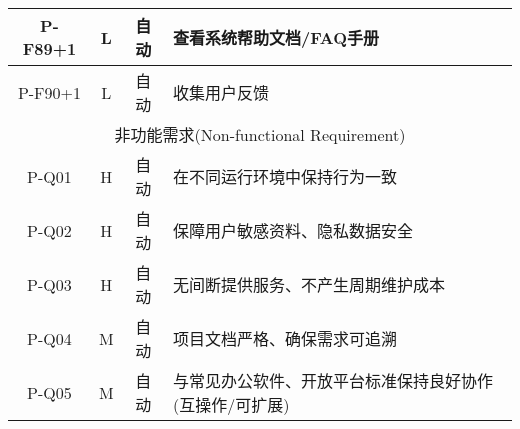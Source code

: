 \begin{longtable}{|c|c|c|X|}
  P-F89+1 & L & 自动 & 查看系统帮助文档/FAQ手册 \\ \hline
  P-F90+1 & L & 自动 & 收集用户反馈 \\ \hline
  \multicolumn{4}{|c|}{非功能需求(Non-functional Requirement)} \\ \hline
  P-Q01   & H & 自动 & 在不同运行环境中保持行为一致 \\ \hline
  P-Q02   & H & 自动 & 保障用户敏感资料、隐私数据安全 \\ \hline
  P-Q03   & H & 自动 & 无间断提供服务、不产生周期维护成本 \\ \hline
  P-Q04   & M & 自动 & 项目文档严格、确保需求可追溯 \\ \hline
  P-Q05   & M & 自动 & 与常见办公软件、开放平台标准保持良好协作(互操作/可扩展) \\ \hline
\end{longtable}

